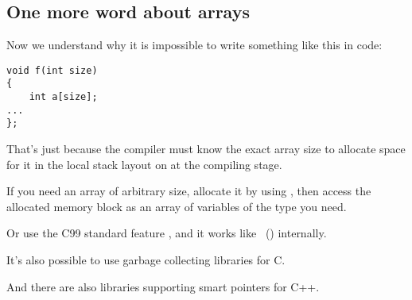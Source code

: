 \subsection{One more word about arrays}


Now we understand why it is impossible to write something like this in \CCpp code:

\begin{lstlisting}
void f(int size)
{
    int a[size];
...
};
\end{lstlisting}


That's just because the compiler must know the exact array size to allocate space for 
it in the local stack layout on at the compiling stage.


If you need an array of arbitrary size, allocate it by using , then access the allocated memory block
as an array of variables of the type you need.


Or use the C99 standard feature ,
and it works like ~() internally.


It's also possible to use garbage collecting libraries for C.

And there are also libraries supporting smart pointers for C++.

